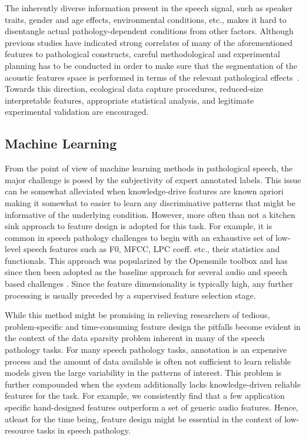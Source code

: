 \documentclass{article}
\begin{document}
The inherently diverse information present in the speech signal, such as speaker traits, gender and age effects, environmental conditions, etc., makes it hard to disentangle actual pathology-dependent conditions from other factors. Although previous studies have indicated strong correlates of many of the aforementioned features to pathological constructs, careful methodological and experimental planning has to be conducted in order to make sure that the segmentation of the acoustic features space is performed in terms of the relevant pathological effects~\cite{bone2013classifying}. Towards this direction, ecological data capture procedures, reduced-size interpretable features, appropriate statistical analysis, and legitimate experimental validation are encouraged.

\subsection{Machine Learning}
From the point of view of machine learning methods in pathological speech, the major challenge is posed by the subjectivity of expert annotated labels. This issue can be somewhat alleviated when knowledge-drive features are known apriori making it somewhat to easier to learn any discriminative patterns that might be informative of the underlying condition. However, more often than not a kitchen sink approach to feature design is adopted for this task. For example, it is common in speech pathology challenges to begin with an exhaustive set of low-level speech features such as F0, MFCC, LPC coeff. etc., their statistics and functionals. This approach was popularized by the Opensmile toolbox \cite{eyben2010themunich} and has since then been adopted as the baseline approach for several audio and speech based challenges \cite{}. Since the feature dimensionality is typically high, any further processing is usually preceded by a supervised feature selection stage.

While this method might be promising in relieving researchers of tedious, problem-specific and time-consuming feature design the pitfalls become evident in the context of the data sparsity problem inherent in many of the speech pathology tasks. For many speech pathology tasks, annotation is an expensive process and the amount of data available is often not sufficient to learn reliable models given the large variability in the patterns of interest. This problem is further compounded when the system additionally lacks knowledge-driven reliable features for the task. For example, we consistently find that a few application specific hand-designed features outperform a set of generic audio features\cite{kim2013pathology}. Hence, atleast for the time being, feature design might be essential in the context of low-resource tasks in speech pathology.
\end{document}
